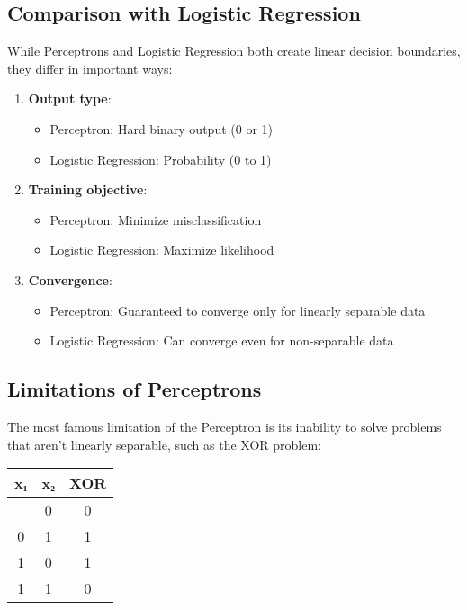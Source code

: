 \documentclass[
  letterpaper,
  DIV=11,
  numbers=noendperiod]{scrreprt}
\providecommand{\tightlist}{%
  \setlength{\itemsep}{0pt}\setlength{\parskip}{0pt}}\usepackage{longtable,booktabs,array}
\begin{document}
\subsection{Comparison with Logistic
Regression}\label{comparison-with-logistic-regression}

While Perceptrons and Logistic Regression both create linear decision
boundaries, they differ in important ways:

\begin{enumerate}
\def\labelenumi{\arabic{enumi}.}
\tightlist
\item
  \textbf{Output type}:

  \begin{itemize}
  \tightlist
  \item
    Perceptron: Hard binary output (0 or 1)
  \item
    Logistic Regression: Probability (0 to 1)
  \end{itemize}
\item
  \textbf{Training objective}:

  \begin{itemize}
  \tightlist
  \item
    Perceptron: Minimize misclassification
  \item
    Logistic Regression: Maximize likelihood
  \end{itemize}
\item
  \textbf{Convergence}:

  \begin{itemize}
  \tightlist
  \item
    Perceptron: Guaranteed to converge only for linearly separable data
  \item
    Logistic Regression: Can converge even for non-separable data
  \end{itemize}
\end{enumerate}

\subsection{Limitations of
Perceptrons}\label{limitations-of-perceptrons}

The most famous limitation of the Perceptron is its inability to solve
problems that aren't linearly separable, such as the XOR problem:

\begin{longtable}[]{@{}ccc@{}}
\toprule\noalign{}
x₁ & x₂ & XOR \\
\midrule\noalign{}
\endhead
\bottomrule\noalign{}
\endlastfoot
0 & 0 & 0 \\
0 & 1 & 1 \\
1 & 0 & 1 \\
1 & 1 & 0 \\
\end{longtable}
\end{document}
